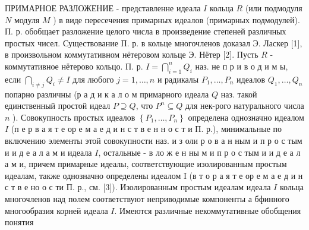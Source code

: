 \documentclass[10pt]{article}
\begin{document}
ПРИМАРНОЕ РАЗЛОЖЕНИЕ - представленне идеала $I$ кольца $R$ (или подмодуля $N$ модуля $M$ ) в виде пересечения примарных идеалов (примарных подмодулей). П. р. обобщает разложение целого числа в произведение степеней различных простых чисел. Существование П. р. в кольце многочленов доказал Э. Ласкер [1], в произвольном коммутативном нётеровом кольце Э. Нётер [2]. Пусть $R$ - коммутативное нётерово кольцо. П. р. $I=\bigcap_{i=1}^{n} Q_{i}$ наз. не п р и в о д и м ы, если $\bigcap_{i \neq j} Q_{i} \neq I$ для любого $j=1, \ldots, n$ и радикалы $P_{1}, \ldots, P_{n}$ идеалов $Q_{1}, \ldots, Q_{n}$ попарно различны (р а д и к а л о м примарного идеала $Q$ наз. такой единственный простой идеал $P \supseteq Q$, что $P^{n} \subseteq Q$ для нек-рого натурального числа $n$ ). Совокупность простых идеалов $\left\{P_{1}, \ldots, P_{n}\right\}$ определена однозначно идеалом $I$ (п е р в а я т е ор е м а е д и н с т в е н н о с т и П. р.), минимальные по включению элементы этой совокупности наз. и з оли р о в а н ным и п р о с тым и и д е а л а м и идеала $I$, остальные - в ло ж е н ны м и п р о с тым и и д е а л а м и, причем примарные идеалы, соответствующие изолированным простым идеалам, также однозначно определены идеалом I (в т о р а я т е ор е м а е д и н с т в е но о с ти П. р., см. [3]). Изолированным простым идеалам идеала $I$ кольца многочленов над полем соответствуют неприводимые компоненты $а$ бфинного многообразия корней идеала $I$. Имеются различные некоммутативные обобщения понятия
\end{document}
